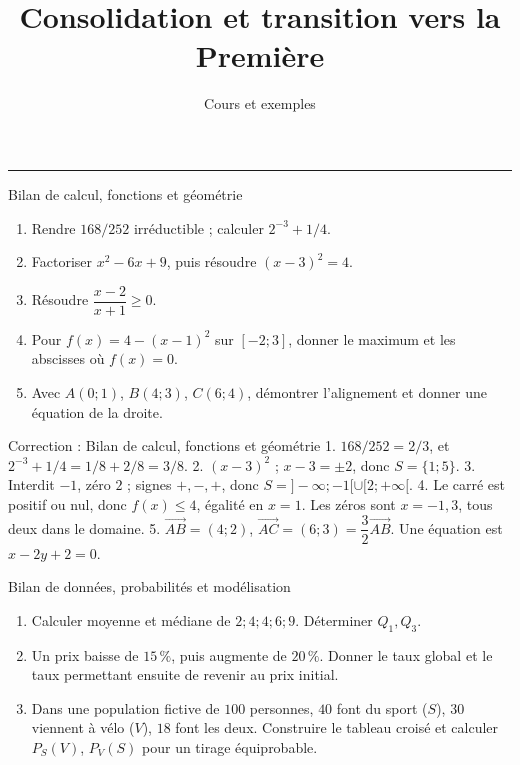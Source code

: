 \documentclass[aspectratio=169,10pt]{beamer}
\title{Consolidation et transition vers la Première}
\subtitle{Cours et exemples}
\date{}
\author{}
\providecommand{\vect}[1]{\overrightarrow{#1}}
\begin{document}
\begin{frame}[plain]
\vfill
{\inserttitle\par}
\medskip
{\insertsubtitle\par}
\medskip
{\rule{\textwidth}{.5pt}}
\vfill
\end{frame}
\begin{frame}{Bilan de calcul, fonctions et géométrie}
\begin{enumerate}
\setcounter{enumi}{0}
\item Rendre \(168/252\) irréductible ; calculer \(2^{-3}+1/4\).

\item Factoriser \(x^2-6x+9\), puis résoudre \((x-3)^2=4\).

\item Résoudre \(\dfrac{x-2}{x+1}\geq0\).

\item Pour \(f(x)=4-(x-1)^2\) sur \([-2;3]\), donner le maximum et les abscisses où \(f(x)=0\).

\item Avec \(A(0;1)\), \(B(4;3)\), \(C(6;4)\), démontrer l'alignement et donner une équation de la droite.

\end{enumerate}
\end{frame}
\begin{frame}{Correction : Bilan de calcul, fonctions et géométrie}
1. \(168/252=2/3\), et \(2^{-3}+1/4=1/8+2/8=3/8\). 2. \((x-3)^2\) ; \(x-3=\pm2\), donc \(S=\{1;5\}\). 3. Interdit \(-1\), zéro \(2\) ; signes \(+,-,+\), donc \(S=]-\infty;-1[\cup[2;+\infty[\). 4. Le carré est positif ou nul, donc \(f(x)\leq4\), égalité en \(x=1\). Les zéros sont \(x=-1,3\), tous deux dans le domaine. 5. \(\vect{AB}=(4;2)\), \(\vect{AC}=(6;3)=\dfrac32\vect{AB}\). Une équation est \(x-2y+2=0\).
\end{frame}
\begin{frame}{Bilan de données, probabilités et modélisation}
\begin{enumerate}
\setcounter{enumi}{0}\item Calculer moyenne et médiane de \(2;4;4;6;9\). Déterminer \(Q_1,Q_3\).

\item Un prix baisse de \(15\,\%\), puis augmente de \(20\,\%\). Donner le taux global et le taux permettant ensuite de revenir au prix initial.

\item Dans une population fictive de \(100\) personnes, \(40\) font du sport (\(S\)), \(30\) viennent à vélo (\(V\)), \(18\) font les deux. Construire le tableau croisé et calculer \(P_S(V)\), \(P_V(S)\) pour un tirage équiprobable.

\end{enumerate}
\end{frame}
\end{document}

